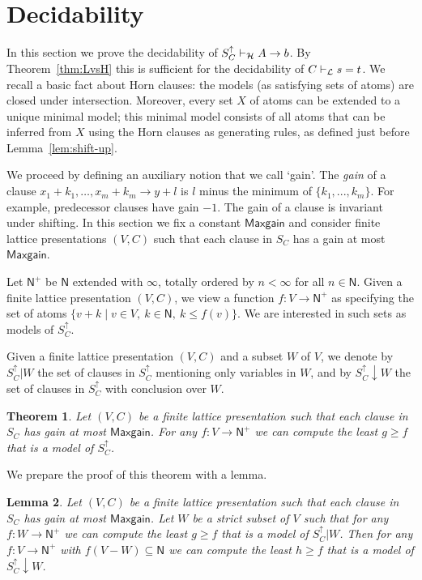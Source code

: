 \documentclass[11pt,a4paper]{article}
\newtheorem{theorem}{Theorem}[section]
\newtheorem{lemma}[theorem]{Lemma}
\newcommand{\N}{\mathsf{N}}
\newcommand\set[1]{\{#1\}}
\newcommand\jbody[3]{{{#1_1}+{#2_1}},\ldots,{{#1_#3}+{#2_#3}}}
\newcommand\lathy{{\cal L}}
\newcommand\prvL{\vdash_{\lathy}}
\newcommand\prvH{\vdash_{\cal H}}
\newcommand\Ninf{\N^+}
\newcommand\M{\mathsf{Maxgain}}
\begin{document}
\section{Decidability}

In this section we prove the decidability of $S^\uparrow_C\prvH A\to b$.
By Theorem~\ref{thm:LvsH} this is sufficient for
the decidability of $C\prvL s=t$. We recall a basic fact
about Horn clauses: the models (as satisfying sets of atoms)
are closed under intersection. Moreover, every set $X$ of atoms
can be extended to a unique minimal model; this minimal model
consists of all atoms that can be inferred from $X$ using the
Horn clauses as generating rules, as defined just before Lemma~\ref{lem:shift-up}. 

We proceed by defining an auxiliary notion that we call `gain'.
The \emph{gain} of a clause $\jbody{x}{k}{m}\to y+l$ is $l$ 
minus the minimum of $\set{k_1, ... ,k_m}$.
For example, predecessor clauses have gain $-1$.
The gain of a clause is invariant under shifting.
In this section we fix a constant $\M$ and consider
finite lattice presentations $(V,C)$ such that
each clause in $S_C$ has a gain at most $\M$.

Let $\Ninf$ be $\N$ extended with $\infty$, totally ordered
by $n < \infty$ for all $n\in\N$. 
Given a finite lattice presentation $(V,C)$, we view
a function $f: V\to\Ninf$ as specifying the set
of atoms $\set{v+k \mid v\in V,~k\in\N,~k \leq f(v)}$.
We are interested in such sets as models of $S^\uparrow_C$.

Given a finite lattice presentation $(V,C)$
and a subset $W$ of $V$, we denote by $S^\uparrow_C|W$ 
the set of clauses in $S^\uparrow_C$ mentioning only variables in $W$,
and by $S^\uparrow_C{\downarrow}W$
the set of clauses in $S^\uparrow_C$ with conclusion over $W$.

\begin{theorem}\label{thm:main}
Let  $(V,C)$ be a finite lattice presentation
such that each clause in $S_C$ has gain at most $\M$.
For any $f: V\to\Ninf$ we can compute
the least $g \geq f$ that is a model of $S^\uparrow_C$.
\end{theorem}

We prepare the proof of this theorem with a lemma.

\begin{lemma}\label{lem:secondary}
Let  $(V,C)$ be a finite lattice presentation
such that each clause in $S_C$ has gain at most $\M$.
Let $W$ be a strict subset of $V$ such that 
for any $f: W\to\Ninf$ we can compute
the least $g \geq f$ that is a model of $S^\uparrow_C|W$.
Then for any $f: V\to\Ninf$ with $f(V-W)\subseteq \N$ we can compute
the least $h \geq f$ that is a model of $S^\uparrow_C{\downarrow}W$.
\end{lemma}
\end{document}
